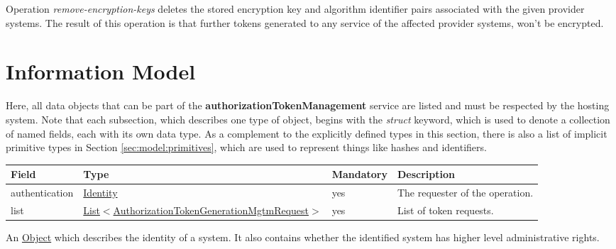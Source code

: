 \documentclass[a4paper]{arrowhead}
\newcommand{\pref}[1]{{\textcolor{ArrowheadGrey}{\hyperref[sec:model:primitives:#1]{#1}}}}
\begin{document}

Operation \textit{remove-encryption-keys} deletes the stored encryption key and algorithm identifier pairs associated with the given provider systems. The result of this operation is that further tokens generated to any service of the affected provider systems, won't be encrypted. 

\clearpage

\section{Information Model}
\label{sec:model}

Here, all data objects that can be part of the \textbf{authorizationTokenManagement} service are listed and must be respected by the hosting system.
Note that each subsection, which describes one type of object, begins with the \textit{struct} keyword, which is used to denote a collection of named fields, each with its own data type.
As a complement to the explicitly defined types in this section, there is also a list of implicit primitive types in Section \ref{sec:model:primitives}, which are used to represent things like hashes and identifiers.



\begin{table}[ht!]
\begin{tabularx}{\textwidth}{| p{3cm} | p{8cm} | p{2cm} | X |} \hline
\rowcolor{gray!33} Field & Type & Mandatory & Description \\ \hline
authentication & \hyperref[sec:model:Identity]{Identity} & yes & The requester of the operation. \\ \hline
list & \pref{List}$<$\hyperref[sec:model:AuthorizationTokenGenerationMgtmRequest]{AuthorizationTokenGenerationMgtmRequest}$>$ & yes & List of token requests. \\ \hline
\end{tabularx}
\end{table}


An \pref{Object} which describes the identity of a system. It also contains whether the identified system has higher level administrative rights.

\end{document}
